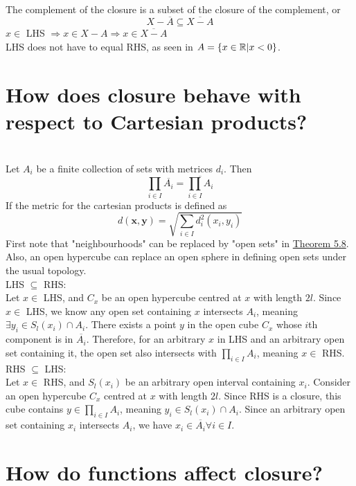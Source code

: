 \begin{parts}
\begin{solution}
 \\The complement of the closure is a subset of the closure of the complement, or
 $$X - \overline{A} \subseteq \overline{X - A}$$
 $x \in$ LHS $\Rightarrow x \in X - A \Rightarrow x \in \overline{X - A}$ \\
 LHS does not have to equal RHS, as seen in $A = \{x \in \mathbb{R}| x < 0\}$.
\end{solution}

 \part{How does closure behave with respect to Cartesian products?}
 
 
\begin{solution}
\\Let $A_i$ be a finite collection of sets with metrices $d_i$. Then
$$ \prod_{i \in I} \overline{A_i} = \overline{\prod_{i \in I} A_i}$$
If the metric for the cartesian products is defined as
$$d(\textbf{x}, \textbf{y}) = \sqrt{\sum_{i \in I}d_i^2(x_i, y_i)}$$
First note that "neighbourhoods" can be replaced by "open sets" in \hyperref[thm4.5.8]{Theorem 5.8}. Also, an open hypercube can replace an open sphere in defining open sets under the usual topology. \\
LHS $\subseteq$ RHS: \\
Let $x \in$ LHS, and $C_x$ be an open hypercube centred at $x$ with length $2l$. Since $x \in$ LHS, we know any open set containing $x$ intersects $A_i$, meaning $\exists y_i \in S_l(x_i) \cap A_i$. There exists a point $y$ in the open cube $C_x$ whose $i$th component is in $\overline{A_i}$. Therefore, for an arbitrary $x$ in LHS and an arbitrary open set containing it, the open set also intersects with $\prod_{i \in I} A_i$, meaning $x \in$ RHS. \\
RHS $\subseteq$ LHS: \\
Let $x \in$ RHS, and $S_l(x_i)$ be an arbitrary open interval containing $x_i$. Consider an open hypercube $C_x$ centred at $x$ with length $2l$. Since RHS is a closure, this cube contains $y \in \prod_{i \in I} A_i$, meaning $y_i \in S_l(x_i) \cap A_i$. Since an arbitrary open set containing $x_i$ intersects $A_i$, we have $x_i \in \overline{A_i} \forall i \in I$.
\end{solution}

 \part{How do functions affect closure?} \label{supp4.5.10}
 

\end{parts}
